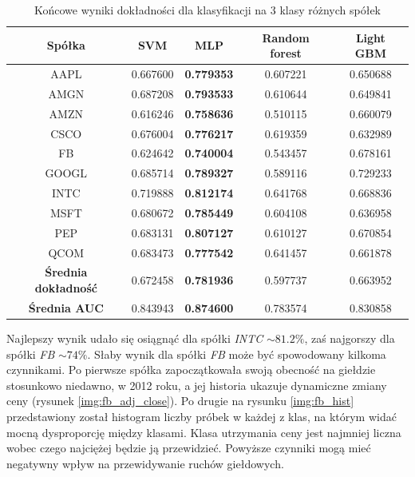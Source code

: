 \documentclass[a4paper, twoside, 11pt, openright]{article}
\begin{document}
 \begin{table}[H]
    \centering
    \begin{tabular}{|c|c|c|c|c|}
    \hline
        \textbf{Spółka} & \textbf{SVM} &  \textbf{MLP}  &  \textbf{Random forest}  &  \textbf{Light GBM} \\ \hline
AAPL   &  0.667600 & \textbf{0.779353}  & 0.607221 & 0.650688 \\ \hline
AMGN   &  0.687208 &  \textbf{0.793533} & 0.610644 &  0.649841 \\ \hline
AMZN   &  0.616246 & \textbf{0.758636} & 0.510115  & 0.660079 \\ \hline
CSCO   &  0.676004 &  \textbf{0.776217} & 0.619359 &  0.632989 \\ \hline
FB     &  0.624642 & \textbf{0.740004} & 0.543457 & 0.678161 \\ \hline
GOOGL  &  0.685714 &  \textbf{0.789327} & 0.589116 & 0.729233 \\ \hline
INTC   &  0.719888 & \textbf{0.812174}  & 0.641768 & 0.668836 \\ \hline
MSFT   &  0.680672 &   \textbf{0.785449} & 0.604108 &  0.636958 \\ \hline
PEP    &  0.683131 & \textbf{0.807127}  & 0.610127 & 0.670854 \\ \hline
QCOM   &  0.683473 &  \textbf{0.777542} & 0.641457 & 0.661878 \\ \hline \hline
\textbf{Średnia dokładność} &  0.672458 & \textbf{0.781936} & 0.597737 & 0.663952 \\  \hline  
\textbf{Średnia AUC} &  0.843943 & \textbf{0.874600} & 0.783574 & 0.830858 \\  \hline
    \end{tabular}
    \caption{Końcowe wyniki dokładności dla klasyfikacji na 3 klasy różnych spółek}
    \label{tab:comparison_final_discrete}
\end{table}   

Najlepszy wynik udało się osiągnąć dla spółki \textit{INTC} $\sim 81.2\%$, zaś najgorszy dla spółki \textit{FB}  $\sim 74\%$. Słaby wynik dla spółki \textit{FB} może być spowodowany kilkoma czynnikami. Po pierwsze spółka zapoczątkowała swoją obecność na giełdzie stosunkowo niedawno, w 2012 roku, a jej historia ukazuje dynamiczne zmiany ceny (rysunek \ref{img:fb_adj_close}). Po drugie na rysunku \ref{img:fb_hist} przedstawiony został histogram liczby próbek w każdej z klas, na którym widać mocną dysproporcję między klasami. Klasa utrzymania ceny jest najmniej liczna wobec czego najciężej będzie ją przewidzieć. Powyższe czynniki mogą mieć negatywny wpływ na przewidywanie ruchów giełdowych.
\end{document}

